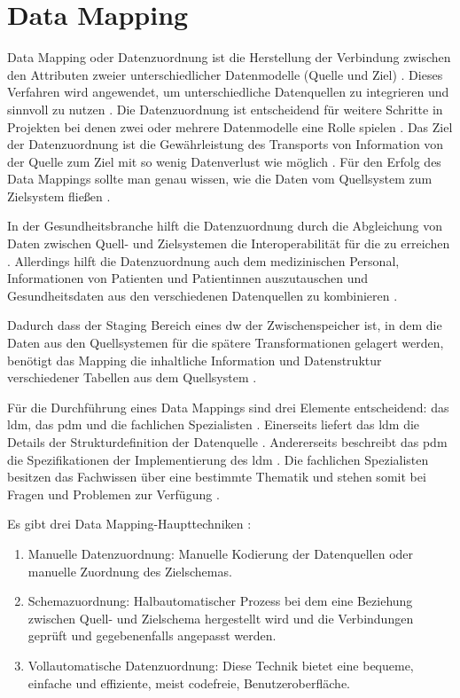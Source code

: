 \section{Data Mapping} \label{subsec:tbasub}

Data Mapping oder Datenzuordnung ist die Herstellung der Verbindung zwischen den Attributen zweier unterschiedlicher Datenmodelle (Quelle und Ziel) \cite{datamappingqs}. Dieses Verfahren wird angewendet, um unterschiedliche Datenquellen zu integrieren und sinnvoll zu nutzen \cite{datamappingastera}. Die Datenzuordnung ist entscheidend für weitere Schritte in Projekten bei denen zwei oder mehrere Datenmodelle eine Rolle spielen \cite{datamappingqs}. Das Ziel der Datenzuordnung ist die Gewährleistung des Transports von Information von der Quelle zum Ziel mit so wenig Datenverlust wie möglich \cite{datamappingastera}. Für den Erfolg des Data Mappings sollte man genau wissen, wie die Daten vom Quellsystem zum Zielsystem fließen \cite{datamappingqs}. 

In der Gesundheitsbranche hilft die Datenzuordnung durch die Abgleichung von Daten zwischen Quell- und Zielsystemen die Interoperabilität für die  zu erreichen \cite{interop, datamappingastera}. Allerdings hilft die Datenzuordnung auch dem medizinischen Personal, Informationen von Patienten und Patientinnen auszutauschen und Gesundheitsdaten aus den verschiedenen Datenquellen zu kombinieren \cite{datamappingastera}.

Dadurch dass der Staging Bereich eines \ac{dw} der Zwischenspeicher ist, in dem die Daten aus den Quellsystemen für die spätere Transformationen gelagert werden, benötigt das Mapping die inhaltliche Information und Datenstruktur verschiedener Tabellen aus dem Quellsystem \cite{datamappingqs, datawarehouse}.

Für die Durchführung eines Data Mappings sind drei Elemente entscheidend: das \ac{ldm}, das \ac{pdm} und die fachlichen Spezialisten \cite{datamappingqs}. Einerseits liefert das \ac{ldm} die Details der Strukturdefinition der Datenquelle \cite{datamappingqs, datamodel}. Andererseits beschreibt das \ac{pdm} die Spezifikationen der Implementierung des \ac{ldm} \cite{datamodel}. Die fachlichen Spezialisten besitzen das Fachwissen über eine bestimmte Thematik und stehen somit bei Fragen und Problemen zur Verfügung \cite{smeitlexicon}.

Es gibt drei Data Mapping-Haupttechniken \cite{datamappingastera}:
\begin{enumerate}
  \item Manuelle Datenzuordnung: Manuelle Kodierung der Datenquellen oder manuelle Zuordnung des Zielschemas.
  \item Schemazuordnung: Halbautomatischer Prozess bei dem eine Beziehung zwischen Quell- und Zielschema hergestellt wird und die Verbindungen geprüft und gegebenenfalls angepasst werden.
  \item Vollautomatische Datenzuordnung: Diese Technik bietet eine bequeme, einfache und effiziente, meist codefreie, Benutzeroberfläche.
\end{enumerate}

